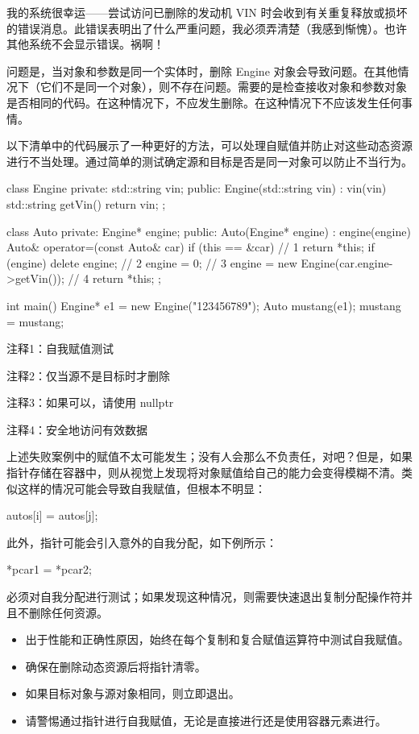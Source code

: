 我的系统很幸运——尝试访问已删除的发动机 VIN 时会收到有关重复释放或损坏的错误消息。此错误表明出了什么严重问题，我必须弄清楚（我感到惭愧）。也许其他系统不会显示错误。祸啊！


问题是，当对象和参数是同一个实体时，删除 Engine 对象会导致问题。在其他情况下（它们不是同一个对象），则不存在问题。需要的是检查接收对象和参数对象是否相同的代码。在这种情况下，不应发生删除。在这种情况下不应该发生任何事情。

以下清单中的代码展示了一种更好的方法，可以处理自赋值并防止对这些动态资源进行不当处理。通过简单的测试确定源和目标是否是同一对象可以防止不当行为。


\begin{cpp}
class Engine {
private:
  std::string vin;
public:
  Engine(std::string vin) : vin(vin) {}
  std::string getVin() { return vin; }
};

class Auto {
private:
  Engine* engine;
public:
  Auto(Engine* engine) : engine(engine) {}
  Auto& operator=(const Auto& car) {
    if (this == &car) // 1
      return *this;
    if (engine) {
      delete engine; // 2
      engine = 0; // 3
    }
    engine = new Engine(car.engine->getVin()); // 4
    return *this;
  }
};

int main() {
  Engine* e1 = new Engine("123456789");
  Auto mustang(e1);
  mustang = mustang;
}
\end{cpp}

{\footnotesize
注释1：自我赋值测试

注释2：仅当源不是目标时才删除

注释3：如果可以，请使用 nullptr

注释4：安全地访问有效数据
}

上述失败案例中的赋值不太可能发生；没有人会那么不负责任，对吧？但是，如果指针存储在容器中，则从视觉上发现将对象赋值给自己的能力会变得模糊不清。类似这样的情况可能会导致自我赋值，但根本不明显：

\begin{cpp}
autos[i] = autos[j];
\end{cpp}

此外，指针可能会引入意外的自我分配，如下例所示：

\begin{cpp}
*pcar1 = *pcar2;
\end{cpp}

必须对自我分配进行测试；如果发现这种情况，则需要快速退出复制分配操作符并且不删除任何资源。


\begin{itemize}
\item
出于性能和正确性原因，始终在每个复制和复合赋值运算符中测试自我赋值。

\item
确保在删除动态资源后将指针清零。

\item
如果目标对象与源对象相同，则立即退出。

\item
请警惕通过指针进行自我赋值，无论是直接进行还是使用容器元素进行。
\end{itemize}






